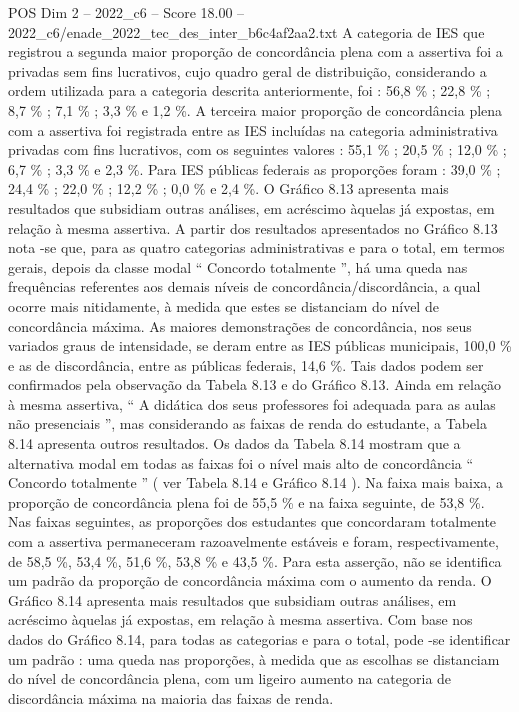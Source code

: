 \begin{textsample}{POS Dim 2 – 2022\_c6 – Score 18.00 – 2022\_c6/enade\_2022\_tec\_des\_inter\_b6c4af2aa2.txt}
A categoria de IES que registrou a segunda maior proporção de concordância plena com a assertiva foi a privadas sem fins lucrativos, cujo quadro geral de distribuição, considerando a ordem utilizada para a categoria descrita anteriormente, foi : 56,8 \% ; 22,8 \% ; 8,7 \% ; 7,1 \% ; 3,3 \% e 1,2 \%.
A terceira maior proporção de concordância plena com a assertiva foi registrada entre as IES incluídas na categoria administrativa privadas com fins lucrativos, com os seguintes valores : 55,1 \% ; 20,5 \% ; 12,0 \% ; 6,7 \% ; 3,3 \% e 2,3 \%.
Para IES públicas federais as proporções foram : 39,0 \% ; 24,4 \% ; 22,0 \% ; 12,2 \% ; 0,0 \% e 2,4 \%.
O Gráfico 8.13 apresenta mais resultados que subsidiam outras análises, em acréscimo àquelas já expostas, em relação à mesma assertiva.
A partir dos resultados apresentados no Gráfico 8.13 nota -se que, para as quatro categorias administrativas e para o total, em termos gerais, depois da classe modal “ Concordo totalmente ”, há uma queda nas frequências referentes aos demais níveis de concordância/discordância, a qual ocorre mais nitidamente, à medida que estes se distanciam do nível de concordância máxima.
As maiores demonstrações de concordância, nos seus variados graus de intensidade, se deram entre as IES públicas municipais, 100,0 \% e as de discordância, entre as públicas federais, 14,6 \%.
Tais dados podem ser confirmados pela observação da Tabela 8.13 e do Gráfico 8.13.
Ainda em relação à mesma assertiva, “ A didática dos seus professores foi adequada para as aulas não presenciais ”, mas considerando as faixas de renda do estudante, a Tabela 8.14 apresenta outros resultados.
Os dados da Tabela 8.14 mostram que a alternativa modal em todas as faixas foi o nível mais alto de concordância “ Concordo totalmente ” ( ver Tabela 8.14 e Gráfico 8.14 ).
Na faixa mais baixa, a proporção de concordância plena foi de 55,5 \% e na faixa seguinte, de 53,8 \%.
Nas faixas seguintes, as proporções dos estudantes que concordaram totalmente com a assertiva permaneceram razoavelmente estáveis e foram, respectivamente, de 58,5 \%, 53,4 \%, 51,6 \%, 53,8 \% e 43,5 \%.
Para esta asserção, não se identifica um padrão da proporção de concordância máxima com o aumento da renda.
O Gráfico 8.14 apresenta mais resultados que subsidiam outras análises, em acréscimo àquelas já expostas, em relação à mesma assertiva.
Com base nos dados do Gráfico 8.14, para todas as categorias e para o total, pode -se identificar um padrão : uma queda nas proporções, à medida que as escolhas se distanciam do nível de concordância plena, com um ligeiro aumento na categoria de discordância máxima na maioria das faixas de renda.

\end{textsample}
